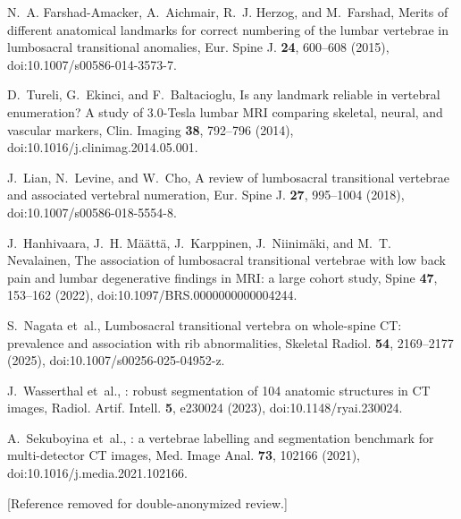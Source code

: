 \documentclass[aapm,mph,amsmath,amssymb,preprint,linenumbers]{revtex4-2}
\newif\ifreview \reviewtrue
\begin{document}
\begin{thebibliography}{20}
N.~A. Farshad-Amacker, A.~Aichmair, R.~J. Herzog, and M.~Farshad,
\newblock Merits of different anatomical landmarks for correct numbering of the lumbar vertebrae in lumbosacral transitional anomalies,
\newblock Eur. Spine J. {\bf 24}, 600--608 (2015),
\newblock doi:10.1007/s00586-014-3573-7.

D.~Tureli, G.~Ekinci, and F.~Baltacioglu,
\newblock Is any landmark reliable in vertebral enumeration? {A} study of 3.0-{Tesla} lumbar {MRI} comparing skeletal, neural, and vascular markers,
\newblock Clin. Imaging {\bf 38}, 792--796 (2014),
\newblock doi:10.1016/j.clinimag.2014.05.001.

J.~Lian, N.~Levine, and W.~Cho,
\newblock A review of lumbosacral transitional vertebrae and associated vertebral numeration,
\newblock Eur. Spine J. {\bf 27}, 995--1004 (2018),
\newblock doi:10.1007/s00586-018-5554-8.

J.~Hanhivaara, J.~H. M{\"a}{\"a}tt{\"a}, J.~Karppinen, J.~Niinim{\"a}ki, and M.~T. Nevalainen,
\newblock The association of lumbosacral transitional vertebrae with low back pain and lumbar degenerative findings in {MRI}: a large cohort study,
\newblock Spine {\bf 47}, 153--162 (2022),
\newblock doi:10.1097/BRS.0000000000004244.

S.~Nagata et~al.,
\newblock Lumbosacral transitional vertebra on whole-spine {CT}: prevalence and association with rib abnormalities,
\newblock Skeletal Radiol. {\bf 54}, 2169--2177 (2025),
\newblock doi:10.1007/s00256-025-04952-z.

J.~Wasserthal et~al.,
: robust segmentation of 104 anatomic structures in {CT} images,
\newblock Radiol. Artif. Intell. {\bf 5}, e230024 (2023),
\newblock doi:10.1148/ryai.230024.

A.~Sekuboyina et~al.,
: a vertebrae labelling and segmentation benchmark for multi-detector {CT} images,
\newblock Med. Image Anal. {\bf 73}, 102166 (2021),
\newblock doi:10.1016/j.media.2021.102166.

\ifreview
[Reference removed for double-anonymized review.]
\else
G.~J. Schwing, P.~Schwing, M.~Ismoilov, N.~Alnabahneh, and L.~Schwiebert,
\newblock Not all spines are created equal: how {CT} segmenters fail on lumbosacral transitional vertebrae,
\newblock in {\em 40th Conference on Neural Information Processing Systems (NeurIPS 2026), Evaluations and Datasets Track}, poster, 2026,
\newblock \url{https://openreview.net/forum?id=D8yRWDAGQF}.
\fi


\end{thebibliography}
\end{document}
